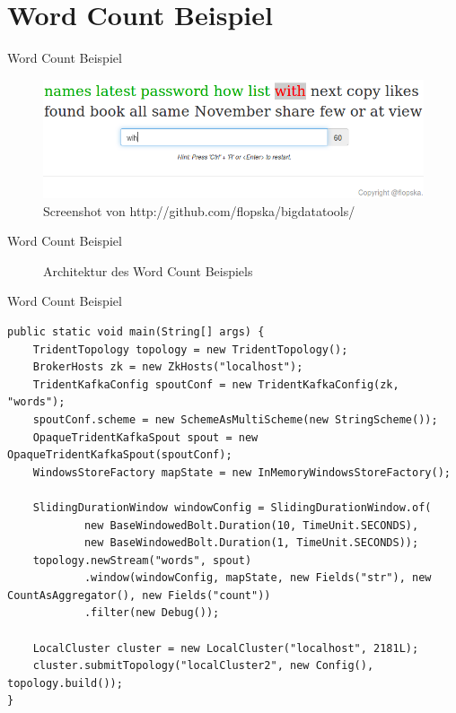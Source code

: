 \documentclass{beamer}
\begin{document}
\section{Word Count Beispiel}
\begin{frame}[t]{Word Count Beispiel}
  \begin{figure}
    \centering
    \includegraphics[scale=0.3,natwidth=750,natheight=234]{img/webapp.png}
    \caption{Screenshot von http://github.com/flopska/bigdatatools/}
  \end{figure}
\end{frame}

\begin{frame}[t]{Word Count Beispiel}
  \begin{figure}[h]
    \center
    \scalebox{.7}{}
    \caption{Architektur des Word Count Beispiels}
    \label{fig:wordcountsamplearchitecture}
  \end{figure}
\end{frame}

\begin{frame}[fragile]{Word Count Beispiel}
  \begin{lstlisting}
public static void main(String[] args) {
	TridentTopology topology = new TridentTopology();
	BrokerHosts zk = new ZkHosts("localhost");
	TridentKafkaConfig spoutConf = new TridentKafkaConfig(zk, "words");
	spoutConf.scheme = new SchemeAsMultiScheme(new StringScheme());
	OpaqueTridentKafkaSpout spout = new OpaqueTridentKafkaSpout(spoutConf);
	WindowsStoreFactory mapState = new InMemoryWindowsStoreFactory();

	SlidingDurationWindow windowConfig = SlidingDurationWindow.of(
			new BaseWindowedBolt.Duration(10, TimeUnit.SECONDS),
			new BaseWindowedBolt.Duration(1, TimeUnit.SECONDS));
	topology.newStream("words", spout)
			.window(windowConfig, mapState, new Fields("str"), new CountAsAggregator(), new Fields("count"))
			.filter(new Debug());

	LocalCluster cluster = new LocalCluster("localhost", 2181L);
	cluster.submitTopology("localCluster2", new Config(), topology.build());
}
  \end{lstlisting}
\end{frame}
\end{document}
